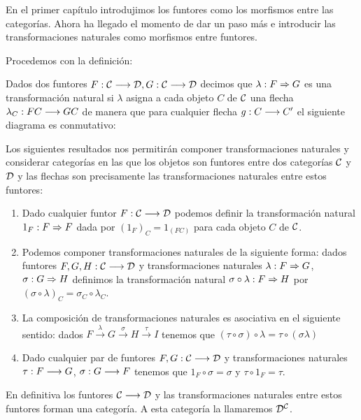 En el primer capítulo introdujimos los funtores como los morfismos
entre las categorías. Ahora ha llegado el momento de dar un paso más
e introducir las transformaciones naturales como morfismos entre
funtores.

Procedemos con la definición:

\begin{definition}
  Dados dos funtores $F: \mathcal{C}\longrightarrow \mathcal{D}, G : \mathcal{C}\longrightarrow \mathcal{D}$ decimos
  que $\lambda : F\Rightarrow G$ es una transformación natural si $\lambda$
  asigna a cada objeto $C$ de $\mathcal{C}$ una flecha
  $\lambda_C : FC\longrightarrow GC$ de manera que para
  cualquier flecha $g : C\longrightarrow C'$ el siguiente diagrama
  es conmutativo:
\begin{center}
  \end{center}
\end{definition}

Los siguientes resultados nos permitirán componer
transformaciones naturales y considerar categorías en las
que los objetos son funtores entre dos categorías $\mathcal{C}$ y $\mathcal{D}$ y las
flechas son precisamente
las transformaciones naturales entre estos funtores:

\begin{proposition}
  \begin{enumerate}
  \item Dado cualquier funtor $F : \mathcal{C}\longrightarrow \mathcal{D}$ podemos definir
    la transformación natural $1_F : F\Rightarrow F$ dada por
    ${(1_F)}_C = 1_{(FC)}$
    para cada objeto $C$ de $\mathcal{C}$.
  \item Podemos componer transformaciones naturales de la siguiente
    forma: dados funtores $F, G, H : \mathcal{C}\longrightarrow \mathcal{D}$ y transformaciones
    naturales $\lambda : F\Rightarrow G$, $\sigma : G\Rightarrow H$
    definimos la transformación natural
    $\sigma \circ \lambda : F\Rightarrow H$ por
    $(\sigma\circ\lambda)_C = \sigma_C \circ \lambda_C$.
  \item La composición de transformaciones naturales
    es asociativa en el siguiente sentido: dados
    $F \xrightarrow{\lambda} G \xrightarrow{\sigma} H \xrightarrow{\tau}I$
    tenemos que $(\tau \circ \sigma) \circ \lambda = \tau \circ (\sigma \lambda)$
  \item Dado cualquier par de funtores $F,G : \mathcal{C}\longrightarrow \mathcal{D}$ y
    transformaciones naturales $\tau : F\longrightarrow G$,
    $\sigma : G\longrightarrow F$ tenemos que $1_F \circ \sigma = \sigma$
    y $\tau \circ 1_F = \tau$.
  \end{enumerate}

  En definitiva los funtores $\mathcal{C}\longrightarrow \mathcal{D}$ y las transformaciones
  naturales entre estos funtores forman una categoría. A esta categoría
  la llamaremos $\mathcal{D}^{\mathcal{C}}$.
\end{proposition}


